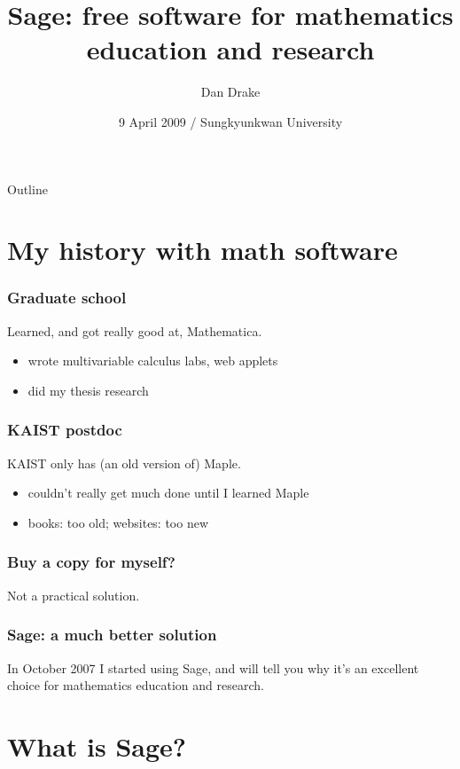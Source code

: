 \documentclass{beamer}
\title[Sage: free software for mathematics]{Sage: free software for
  mathematics education and research}
\author{Dan Drake}
\institute[KAIST]{\texttt{[image: kaist]}}
\date[9 April 2009]{9 April 2009 / Sungkyunkwan University}
\begin{document}
\begin{frame}
  \titlepage
\end{frame}

\begin{frame}{Outline}
  \tableofcontents
\end{frame}

\section{My history with math software}

\begin{frame}
  \frametitle{Graduate school}

  Learned, and got really good at, Mathematica.

  \pause
  \begin{itemize}
  \item wrote multivariable calculus labs, web applets
  \pause
  \item did my thesis research
  \end{itemize}
\end{frame}

\begin{frame}
  \frametitle{KAIST postdoc}

  KAIST only has (an old version of) Maple.

  \begin{itemize}
    \item couldn't really get much done until I learned Maple
    \pause
    \item books: too old; websites: too new
  \end{itemize}

\end{frame}

\begin{frame}
  \frametitle{Buy a copy for myself?}
 
  Not a practical solution.
 
\end{frame}

\begin{frame}
  \frametitle{Sage: a much better solution}
  
  In October 2007 I started using Sage, and will tell you why it's an
  excellent choice for mathematics education and research.

\end{frame}

\section{What is Sage?}
\end{document}
